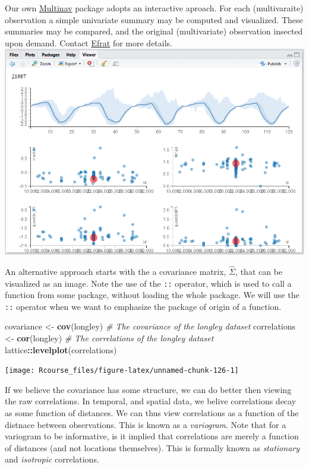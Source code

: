 \documentclass[]{book}
\newenvironment{Shaded}{\begin{snugshade}}{\end{snugshade}}
\newcommand{\KeywordTok}[1]{\textcolor[rgb]{0.13,0.29,0.53}{\textbf{#1}}}
\newcommand{\StringTok}[1]{\textcolor[rgb]{0.31,0.60,0.02}{#1}}
\newcommand{\CommentTok}[1]{\textcolor[rgb]{0.56,0.35,0.01}{\textit{#1}}}
\newcommand{\OperatorTok}[1]{\textcolor[rgb]{0.81,0.36,0.00}{\textbf{#1}}}
\newcommand{\NormalTok}[1]{#1}
\theoremstyle{definition}
\theoremstyle{definition}
\theoremstyle{definition}
\theoremstyle{remark}
\begin{document}
Our own \href{https://github.com/EfratVil/MultiNav}{Multinav} package
adopts an interactive aproach. For each (multivaraite) observation a
simple univariate summary may be computed and visualized. These
summaries may be compared, and the original (multivariate) observation
insected upon demand. Contact
\href{http://efratvil.github.io/home/index.html}{Efrat} for more
details.\\
\includegraphics{art/multinav.png}

An alternative approach starts with the a covariance matrix,
\(\hat \Sigma\), that can be visualized as an image. Note the use of the
\texttt{::} operator, which is used to call a function from some
package, without loading the whole package. We will use the \texttt{::}
operator when we want to emphasize the package of origin of a function.

\begin{Shaded}
\begin{Highlighting}[]
\NormalTok{covariance <-}\StringTok{ }\KeywordTok{cov}\NormalTok{(longley) }\CommentTok{# The covariance of the longley dataset}
\NormalTok{correlations <-}\StringTok{ }\KeywordTok{cor}\NormalTok{(longley) }\CommentTok{# The correlations of the longley dataset}
\NormalTok{lattice}\OperatorTok{::}\KeywordTok{levelplot}\NormalTok{(correlations)}
\end{Highlighting}
\end{Shaded}

\texttt{[image: Rcourse\_files/figure-latex/unnamed-chunk-126-1]}

If we believe the covariance has some structure, we can do better then
viewing the raw correlations. In temporal, and spatial data, we belive
correlations decay as some function of distances. We can thus view
correlations as a function of the distnace between observations. This is
known as a \emph{variogram}. Note that for a variogram to be
informative, is it implied that correlations are merely a function of
distances (and not locations themselves). This is formally known as
\emph{stationary} and \emph{isotropic} correlations.
\end{document}
